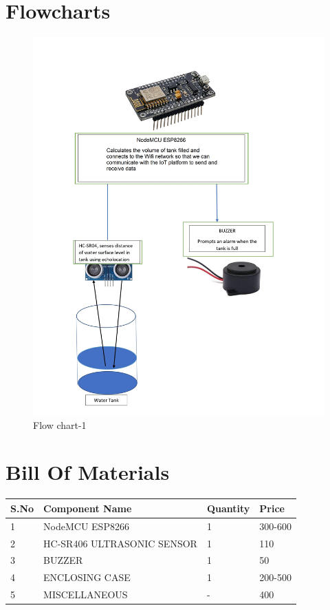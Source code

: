 \documentclass[12pt]{article}
\begin{document}
\section*{Flowcharts}
\vspace{0.3cm}
 \begin{figure}[H]
\centering
    \includegraphics[scale=0.65]{01.jpg}
    \caption{Flow chart-1}
    \label{fig:my_label}
\end{figure}
\clearpage
\section*{Bill Of Materials}
\vspace{0.75cm}


\begin{tabular}{ |p{1cm}||p{7cm}|p{2cm}|p{2cm}|  }

 \hline
 
 \hline
 S.No & Component Name  &Quantity & Price\\
 \hline
 1 & NodeMCU ESP8266 & 1& 300-600\\
 2&	HC-SR406 ULTRASONIC SENSOR& 1&	110\\
 3&	BUZZER&	1&	50\\
 4&	ENCLOSING CASE&	1&	200-500\\
 5&	MISCELLANEOUS&	-&	400\\

 \hline
\end{tabular}
\vspace{0.3cm}
\end{document}
